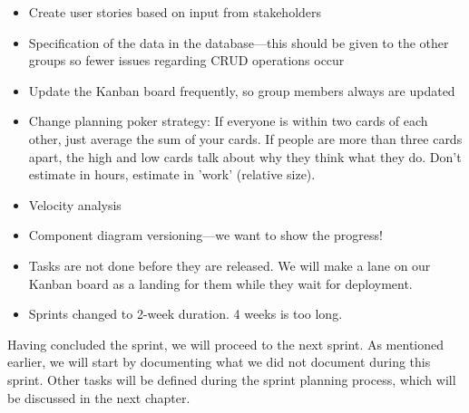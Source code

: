 \begin{itemize}
    \item Create user stories based on input from stakeholders
    \item Specification of the data in the database---this should be given to the other groups so fewer issues regarding CRUD operations occur
    \item Update the Kanban board frequently, so group members always are updated
    \item Change planning poker strategy:
    \subitem If everyone is within two cards of each other, just average the sum of your cards.
    \subitem If people are more than three cards apart, the high and low cards talk about why they think what they do.
    \subitem Don't estimate in hours, estimate in 'work' (relative size).
    \item Velocity analysis
    \item Component diagram versioning---we want to show the progress!
    \item Tasks are not done before they are released. We will make a lane on our Kanban board as a landing for them while they wait for deployment.
    \item Sprints changed to 2-week duration. 4 weeks is too long.
\end{itemize}

Having concluded the sprint, we will proceed to the next sprint. As mentioned earlier, we will start by documenting what we did not document during this sprint. 
Other tasks will be defined during the sprint planning process, which will be discussed in the next chapter.